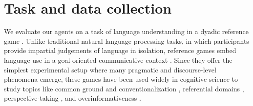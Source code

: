 \documentclass[11pt,letterpaper]{article}
\newcommand{\Listener}{L}
\newcommand{\utt}{u}
\newcommand{\referent}{c}
\newcommand{\context}{C}
\newcommand{\contextlen}{K}
\newcommand{\target}{t}
\renewcommand{\|}{\mid}
\begin{document}
\section{Task and data collection}\label{sec:corpus}

We evaluate our agents on a task of language understanding in a dyadic reference
game \cite{Rosenberg:Cohen:1964,KraussWeinheimer64_ReferencePhrases,Paetzel-etal:2014}. Unlike traditional natural language processing tasks, in which participants provide impartial judgements of language in isolation, reference games embed language use in a goal-oriented communicative context \cite{Clark96,TanenhausBrownSchmidt08_LanguageNatural}. Since they offer the simplest experimental setup where many pragmatic and discourse-level phenomena emerge, these games have been used widely in cognitive science to study topics like common ground and conventionalization \cite{Clark:Wilkes-Gibbs:1986}, referential domains \cite{BrownSchmidtTanenhaus08_TargetedGame}, perspective-taking \cite{HannaTanenhausTrueswell03_CommonGroundPerspective}, and overinformativeness \cite{KoolenGattGoudbeekKrahmer11_Overspecification}.

\end{document}
